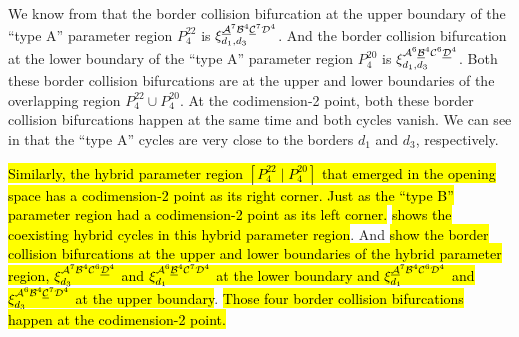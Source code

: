 We know from  that the border collision bifurcation at the upper boundary of the ``type A'' parameter region $P^{22}_4$ is $\xi_{d_1, d_3}^{\underline{\mathcal{A}}^7\mathcal{B}^4\underline{\mathcal{C}}^7\mathcal{D}^4}$.
And the border collision bifurcation at the lower boundary of the ``type A'' parameter region $P^{20}_4$ is $\xi_{d_1, d_3}^{\mathcal{A}^6\underline{\mathcal{B}}^4\mathcal{C}^6\underline{\mathcal{D}}^4}$.
Both these border collision bifurcations are at the upper and lower boundaries of the overlapping region $P^{22}_4 \cup P^{20}_4$.
At the codimension-2 point, both these border collision bifurcations happen at the same time and both cycles vanish.
We can see in  that the ``type A'' cycles are very close to the borders $d_1$ and $d_3$, respectively.

\hl{
	Similarly, the hybrid parameter region $\left[P^{22}_4 \mid P^{20}_4\right]$ that emerged in the opening space has a codimension-2 point as its right corner.
	Just as the ``type B'' parameter region had a codimension-2 point as its left corner.
}
 \hl{shows the coexisting hybrid cycles in this hybrid parameter region}.
And  \hl{show the border collision bifurcations at the upper and lower boundaries of the hybrid parameter region, $\xi_{d_3}^{\mathcal{A}^7\mathcal{B}^4\mathcal{C}^6\underline{\mathcal{D}}^4}$ and $\xi_{d_1}^{\mathcal{A}^6\underline{\mathcal{B}}^4\mathcal{C}^7\mathcal{D}^4}$ at the lower boundary and $\xi_{d_1}^{\underline{\mathcal{A}}^7\mathcal{B}^4\mathcal{C}^6\mathcal{D}^4}$ and $\xi_{d_3}^{\mathcal{A}^6\mathcal{B}^4\underline{\mathcal{C}}^7\mathcal{D}^4}$ at the upper boundary}.
\hl{
	Those four border collision bifurcations happen at the codimension-2 point.
}

